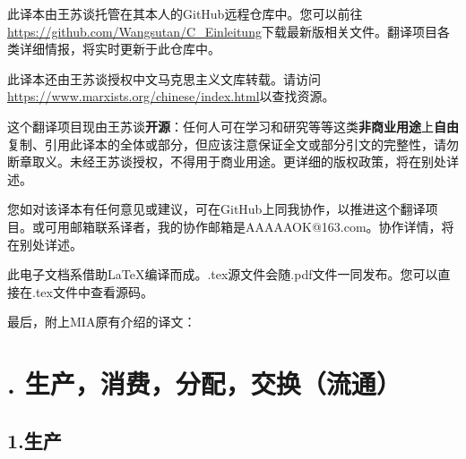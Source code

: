 \documentclass[a4paper,twoside,12pt]{ctexart}
\begin{document}
此译本由王苏谈托管在其本人的GitHub远程仓库中。您可以前往\url{https://github.com/Wangsutan/C_Einleitung}下载最新版相关文件。翻译项目各类详细情报，将实时更新于此仓库中。

此译本还由王苏谈授权中文马克思主义文库转载。请访问\url{https://www.marxists.org/chinese/index.html}以查找资源。

这个翻译项目现由王苏谈\textbf{开源}：任何人可在学习和研究等等这类\textbf{非商业用途}上\textbf{自由}复制、引用此译本的全体或部分，但应该注意保证全文或部分引文的完整性，请勿断章取义。未经王苏谈授权，不得用于商业用途。更详细的版权政策，将在别处详述。

您如对该译本有任何意见或建议，可在GitHub上同我协作，以推进这个翻译项目。或可用邮箱联系译者，我的协作邮箱是AAAAAOK@163.com。协作详情，将在别处详述。

此电子文档系借助\LaTeX 编译而成。.tex源文件会随.pdf文件一同发布。您可以直接在.tex文件中查看源码。

最后，附上MIA原有介绍的译文：


\begin{adjustwidth}{2em}{2em}
\end{adjustwidth}


\newpage


\section{\uppercase\expandafter{}. 生产，消费，分配，交换（流通）}

\subsection{1.生产}
\end{document}
